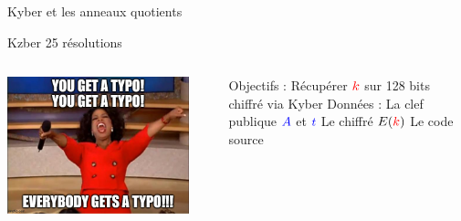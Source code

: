 \begin{frame}{Kyber et les anneaux quotients}
    \large{\centerline{\textbf{}}}

\end{frame}


\begin{frame}{Kzber \FiveStar \FiveStar\FiveStar \hfill 25 résolutions}
    \begin{columns}[c]
        \begin{center}                  
            \includegraphics[width=0.9\textwidth]{img/meme/kyber-intro.png}
        \end{center}

           \begin{outline}
                \1 Objectifs : 
                    \2 Récupérer $\textcolor{red}{k}$ sur 128 bits  chiffré via Kyber
                \1 Données :
                    \2 La clef publique $\textcolor{blue}{A}$ et $\textcolor{blue}{t}$
                    \2 Le chiffré $E(\textcolor{red}{k})$
                    \2 Le code source
           \end{outline}
    \end{columns}
\end{frame}


